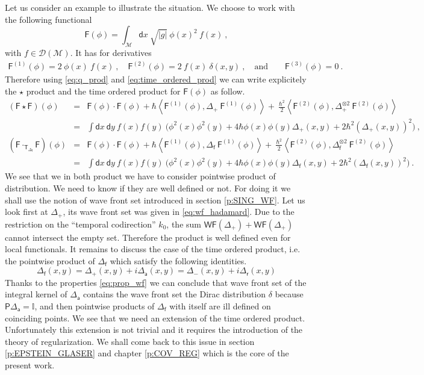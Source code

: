 \documentclass[11pt]{book}
\newcommand{\WF}{\mathsf{WF}}
\newcommand{\abs}[1]{\left|#1\right|}
\newcommand{\sm}[1]{\left\langle#1\right\rangle}
\newcommand{\Dcal}{\mathcal{D}}
\newcommand{\Mcal}{\mathcal{M}}
\newcommand{\Ibb}{\mathbb{I}}
\newcommand{\Fsf}{\mathsf{F}}
\newcommand{\Psf}{\mathsf{P}}
\newcommand{\Tsf}{\mathsf{T}}
\newcommand{\asf}{\mathsf{a}}
\newcommand{\dsf}{\mathsf{d}}
\newcommand{\fsf}{\mathsf{f}}
\newcommand{\rsf}{\mathsf{r}}
\theoremstyle{break}
\begin{document}
Let us consider an example to illustrate the situation. We choose to work with the following functional
%
\begin{equation*}
\Fsf(\phi) = \int_\Mcal \dsf x \ \sqrt{\abs{g}} \ \phi(x)^2 \ f(x)  \ ,
\end{equation*}
%
with $f \in \Dcal(\Mcal)$. It has for derivatives
%
\begin{eqnarray*}
\Fsf^{(1)}(\phi) = 2 \ \phi(x) \ f(x) \ , \quad \Fsf^{(2)}(\phi) = 2 \ f(x) \ \delta(x,y) \ , \quad \mbox{and} \qquad \Fsf^{(3)}(\phi) = 0 \ .
\end{eqnarray*}
%
Therefore using \eqref{eq:q_prod} and \eqref{eq:time_ordered_prod} we can write explicitely the $\star$ product and the time ordered product for $\Fsf(\phi)$ as follow.
%
\begin{eqnarray*}
(\Fsf \star \Fsf)(\phi) &=& \Fsf(\phi) \cdot \Fsf(\phi) + \hbar \sm{ \Fsf^{(1)}(\phi) , \Delta_+ \ \Fsf^{(1)}(\phi) } + \ \frac{\hbar^2}{2} \sm{ \Fsf^{(2)}(\phi) , \Delta_+^{\otimes 2} \ \Fsf^{(2)}(\phi)} \\
%
&=& \int \dsf x \ \dsf y \ f(x) f(y) \ \bigg( \phi^2(x) \phi^2(y) + 4 \hbar \phi(x) \phi(y) \Delta_+(x,y) + 2 \hbar^2 \left(\Delta_+(x,y)\right)^2 \bigg) \ , \\[8pt]
%
(\Fsf \cdot_{\Tsf_{\Delta_\fsf}} \Fsf)(\phi) &=& \Fsf(\phi) \cdot \Fsf(\phi) + \hbar \sm{ \Fsf^{(1)}(\phi) , \Delta_\fsf \ \Fsf^{(1)}(\phi) } + \ \frac{\hbar^2}{2} \sm{ \Fsf^{(2)}(\phi) , \Delta_\fsf^{\otimes 2} \ \Fsf^{(2)}(\phi)} \\
%
&=& \int \dsf x \ \dsf y \ f(x) f(y) \ \bigg( \phi^2(x) \phi^2(y) + 4 \hbar \phi(x) \phi(y) \Delta_\fsf(x,y) + 2 \hbar^2 \left(\Delta_\fsf(x,y)\right)^2 \bigg) \ .
\end{eqnarray*}
%
We see that we in both product we have to consider pointwise product of distribution. We need to know if they are well defined or not. For doing it we shall use the notion of wave front set introduced in section \ref{p:SING_WF}. Let us look first at $\Delta_+$, its wave front set was given in \eqref{eq:wf_hadamard}. Due to the restriction on the ``temporal codirection'' $k_0$, the sum $\WF(\Delta_+) + \WF(\Delta_+)$ cannot intersect the empty set. Therefore the product is well defined even  for local functionals. It remains to discuss the case of the time ordered product, i.e. the pointwise product of $\Delta_\fsf$ which satisfy the following identities.
%
\begin{equation}
\Delta_\fsf(x,y) = \Delta_+(x,y) + i \Delta_\asf(x,y) = \Delta_-(x,y) + i \Delta_\rsf(x,y) 
\label{eq:conv_feynman_prop}
\end{equation}
%
Thanks to the properties \eqref{eq:prop_wf} we can conclude that wave front set of the integral kernel of $\Delta_\asf$ contains the wave front set the Dirac distribution $\delta$ because $\Psf \Delta_\asf = \Ibb$, and then pointwise products of $\Delta_\fsf$ with itself are ill defined on coinciding points.  We see that we need an extension of the time ordered product. Unfortunately this extension is not trivial and it requires the introduction of the theory of regularization. We shall come back to this issue in section \ref{p:EPSTEIN_GLASER} and chapter \ref{p:COV_REG} which is the core of the present work.
\end{document}
